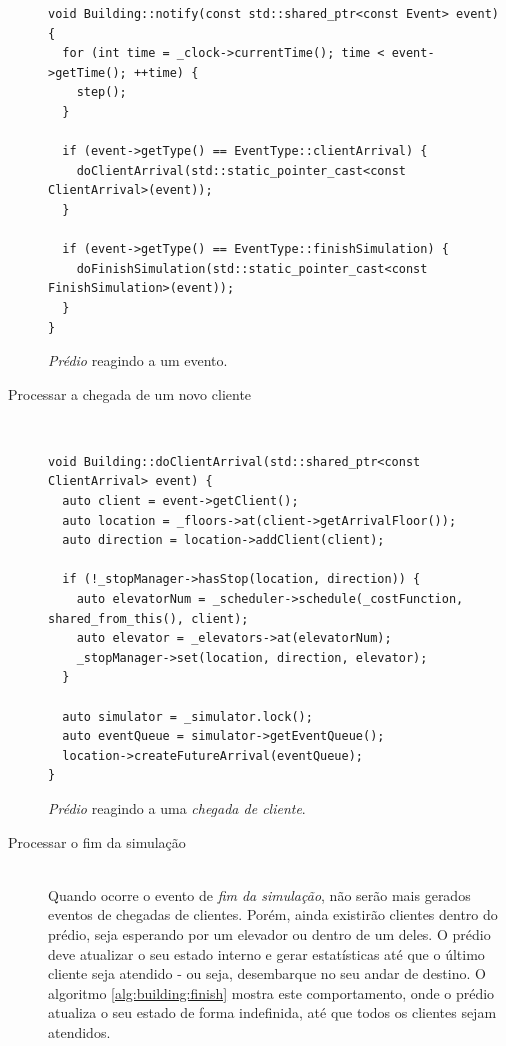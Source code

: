\begin{description}
    \begin{algorithm}[htb]
      \centering
        \begin{verbatim}
void Building::notify(const std::shared_ptr<const Event> event) {
  for (int time = _clock->currentTime(); time < event->getTime(); ++time) {
    step();
  }

  if (event->getType() == EventType::clientArrival) {
    doClientArrival(std::static_pointer_cast<const ClientArrival>(event));
  }

  if (event->getType() == EventType::finishSimulation) {
    doFinishSimulation(std::static_pointer_cast<const FinishSimulation>(event));
  }
}
        \end{verbatim}
      \caption{\textit{Prédio} reagindo a um evento.}
      \label{alg:building:notify}
    \end{algorithm}

  \item[Processar a chegada de um novo cliente] \hfill \\

    \begin{algorithm}[htb]
      \centering
        \begin{verbatim}
void Building::doClientArrival(std::shared_ptr<const ClientArrival> event) {
  auto client = event->getClient();
  auto location = _floors->at(client->getArrivalFloor());
  auto direction = location->addClient(client);

  if (!_stopManager->hasStop(location, direction)) {
    auto elevatorNum = _scheduler->schedule(_costFunction, shared_from_this(), client);
    auto elevator = _elevators->at(elevatorNum);
    _stopManager->set(location, direction, elevator);
  }

  auto simulator = _simulator.lock();
  auto eventQueue = simulator->getEventQueue();
  location->createFutureArrival(eventQueue);
}
        \end{verbatim}
      \caption{\textit{Prédio} reagindo a uma \textit{chegada de cliente}.}
      \label{alg:building:arrival}
    \end{algorithm}

  \item[Processar o fim da simulação] \hfill \\

    Quando ocorre o evento de \textit{fim da simulação}, não serão mais gerados
    eventos de chegadas de clientes. Porém, ainda existirão clientes dentro do
    prédio, seja esperando por um elevador ou dentro de um deles. O prédio deve
    atualizar o seu estado interno e gerar estatísticas até que o último cliente
    seja atendido - ou seja, desembarque no seu andar de destino. O algoritmo
    \ref{alg:building:finish} mostra este comportamento, onde o prédio atualiza
    o seu estado de forma indefinida, até que todos os clientes sejam atendidos.


\end{description}
